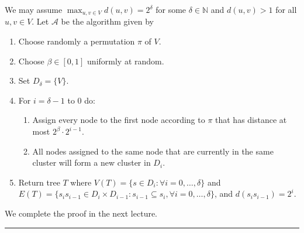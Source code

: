 \documentclass[letterpaper,12pt,oneside,onecolumn]{article}
\newcommand{\N}{\mathbb{N}} \newcommand{\R}{\mathbb{R}}
\newcommand{\cA}{\mathcal{A}} \newcommand{\cB}{\mathcal{B}}
\newenvironment{proof}{{\bf Proof:  }}{\hfill\rule{2mm}{2mm}}
\begin{document}
\begin{proof}
We may assume $\max_{u,v \in V} d(u,v) = 2^\delta$ for some $\delta \in \N$ and $d(u,v) > 1$ for all $u,v\in V$. Let $\cA$ be the algorithm given by
\begin{enumerate}
\item Choose randomly a permutation $\pi$ of $V$.
\item Choose $\beta \in [0,1]$ uniformly at random.
\item Set $D_\delta = \{V\}$.
\item For $i = \delta -1$ to $0$ do:
\begin{enumerate}
\item Assign every node to the first node according to $\pi$ that has distance at most $2^\beta \cdot 2^{i-1}$.
\item All nodes assigned to the same node that are currently in the same cluster will form a new cluster in $D_i$.
\end{enumerate}
\item Return tree $T$ where $V(T) = \{s \in D_i : \forall i = 0, \dots, \delta\}$ and $E(T) = \{s_is_{i-1}  \in D_{i}\times D_{i-1}: s_{i-1} \subseteq s_i, \forall i = 0,\dots,\delta\}$, and $d(s_is_{i-1}) = 2^i$.
\end{enumerate}
We complete the proof in the next lecture.
\end{proof}
\end{document}
